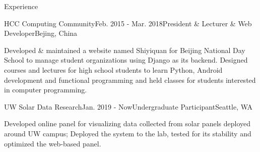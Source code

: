 \documentclass{resume}
\begin{document}
	\vspace{-5pt}

	\begin{rSection}{Experience}



		\begin{rSubsection}{HCC Computing Community}{Feb. 2015 - Mar. 2018}{President \& Lecturer \& Web Developer}{Bejing, China}
			\item Developed \& maintained a website named Shiyiquan for Beijing National Day School to manage student organizations using Django as its backend. Designed courses and lectures for high school students to learn Python, Android development and functional programming and held classes for students interested in computer programming.
		\end{rSubsection}
		\vspace{-5pt}
		\begin{rSubsection}{UW Solar Data Research}{Jan. 2019 - Now}{Undergraduate Participant}{Seattle, WA}
			\item Developed online panel for visualizing data collected from solar panels deployed around UW campus; Deployed the system to the lab, tested for its stability and optimized the web-based panel.
		\end{rSubsection}

	\end{rSection}
	\vspace{-5pt}
\end{document}
